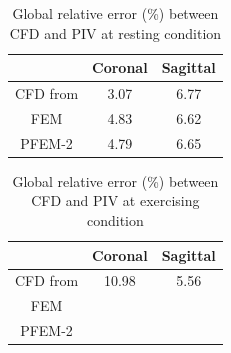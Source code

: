 \begin{table}[h]
\caption {Global relative error (\%) between CFD and PIV at resting condition} \label{tab:convergence}
\centering
\begin{tabular}{|c|c|c|}
\hline
       & Coronal & Sagittal \\ \hline
CFD from \cite{craven_cfd}  & 3.07    & 6.77     \\ \hline
FEM    & 4.83    & 6.62     \\ \hline
PFEM-2 & 4.79    & 6.65     \\ \hline
\end{tabular}
\end{table}

\begin{table}[h]
\caption {Global relative error (\%) between CFD and PIV at exercising condition} \label{tab:convergence}
\centering
\begin{tabular}{|c|c|c|}
\hline
       & Coronal & Sagittal \\ \hline
CFD from \cite{craven_cfd}  & 10.98	&5.56 \\ \hline
FEM    &      &    \\ \hline
PFEM-2 &     &       \\ \hline
\end{tabular}
\end{table}
